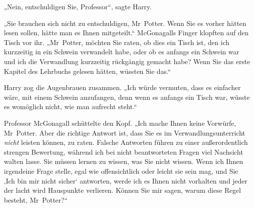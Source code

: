 „Nein, entschuldigen Sie, Professor“, sagte Harry.

„Sie brauchen sich nicht zu entschuldigen, Mr~Potter. Wenn Sie es vorher hätten lesen sollen, hätte man es Ihnen mitgeteilt.“ McGonagalls Finger klopften auf den Tisch vor ihr. „Mr~Potter, möchten Sie raten, ob dies ein Tisch ist, den ich kurzzeitig in ein Schwein verwandelt habe, oder ob es anfangs ein Schwein war und ich die Verwandlung kurzzeitig rückgängig gemacht habe? Wenn Sie das erste Kapitel des Lehrbuchs gelesen hätten, wüssten Sie das.“

Harry zog die Augenbrauen zusammen. „Ich würde vermuten, dass es einfacher wäre, mit einem Schwein anzufangen, denn wenn es anfangs ein Tisch war, wüsste es womöglich nicht, wie man aufrecht steht.“

Professor McGonagall schüttelte den Kopf. „Ich mache Ihnen keine Vorwürfe, Mr~Potter. Aber die richtige Antwort ist, dass Sie es im Verwandlungsunterricht \emph{nicht} leisten können, zu raten. Falsche Antworten führen zu einer außerordentlich strengen Bewertung, während ich bei nicht beantworteten Fragen viel Nachsicht walten lasse. Sie müssen lernen zu wissen, was Sie nicht wissen. Wenn ich Ihnen irgendeine Frage stelle, egal wie offensichtlich oder leicht sie sein mag, und Sie ‚Ich bin mir nicht sicher‘ antworten, werde ich es Ihnen nicht vorhalten und jeder der lacht wird Hauspunkte verlieren. Können Sie mir sagen, warum diese Regel besteht, Mr~Potter?“

